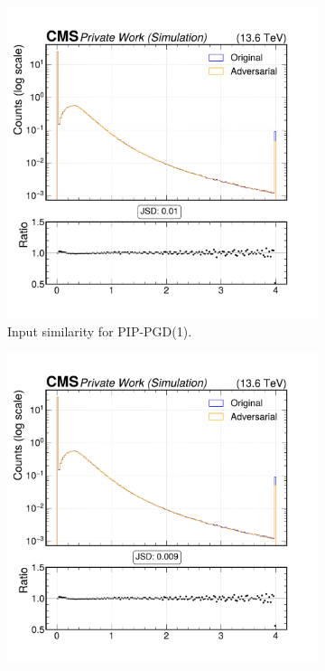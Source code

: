 \begin{figure}[htbp]
  \centering
  \begin{subfigure}[t]{0.32\textwidth}
    \includegraphics[width=\linewidth]{media/output/features/compare/combined_it_1/cmp_cpf_arr_Cpfcan_BtagPf_trackPtRel.pdf}
    \caption*{Input similarity for PIP-PGD(1).}
  \end{subfigure}\hfill
  \begin{subfigure}[t]{0.32\textwidth}
    \includegraphics[width=\linewidth]{media/output/features/compare/combined_it_2/cmp_cpf_arr_Cpfcan_BtagPf_trackPtRel.pdf}

\end{subfigure}
\end{figure}
